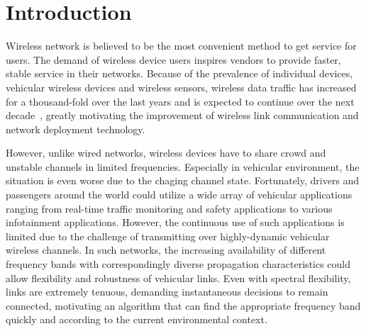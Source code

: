 \chapter{Introduction} \label{ch:introduction}

Wireless network is believed to be the most convenient method to get service 
for users. The demand of wireless device users inspires vendors to provide 
faster, stable service in their networks. Because of the prevalence of 
individual devices, vehicular wireless devices and wireless sensors, wireless 
data traffic has increased for a thousand-fold over the last years and is 
expected to continue over the next decade~\cite{metis}, greatly motivating 
the improvement of wireless link communication and network deployment technology.

However, unlike wired networks, wireless devices have to share crowd
and unstable channels in limited frequencies. Especially in vehicular
environment, the situation is even worse due to the chaging channel 
state. Fortunately, drivers and passengers around the world could utilize a 
wide array of vehicular applications ranging from real-time traffic 
monitoring and safety applications to various infotainment applications.
However, the continuous use of such applications is limited due to the
challenge of transmitting over highly-dynamic vehicular wireless channels.
In such networks, the increasing availability of different frequency bands 
with correspondingly diverse propagation characteristics could allow flexibility 
and robustness of vehicular links. Even with spectral flexibility, links are 
extremely tenuous, demanding instantaneous decisions to remain connected, 
motivating an algorithm that can find the appropriate frequency band quickly 
and according to the current environmental context.


